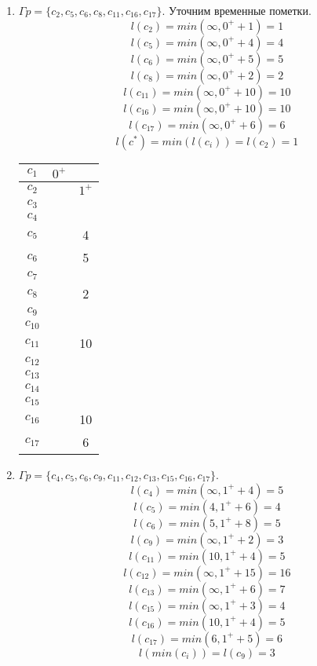 \documentclass[12pt, a4paper] {ncc}
\begin{document}
\begin{enumerate}
    \item $\Gamma p = \{ c_2, c_5, c_6, c_8, c_11, c_16, c_17\}$. Уточним временные пометки.  
        $$l(c_2)    = min(\infty, 0^+ + 1) = 1$$
        $$l(c_5)    = min(\infty, 0^+ + 4) = 4$$
        $$l(c_6)    = min(\infty, 0^+ + 5) = 5$$
        $$l(c_8)    = min(\infty, 0^+ + 2) = 2$$
        $$l(c_{11}) = min(\infty, 0^+ + 10) = 10$$
        $$l(c_{16}) = min(\infty, 0^+ + 10) = 10$$
        $$l(c_{17}) = min(\infty, 0^+ + 6) = 6$$
        $$l(c^*) = min(l(c_i)) = l(c_2) = 1$$
\begin{tabular} {|c|c|c|}
    \hline
    $c_{1}$  &$0^+$&      \\ \hline
    $c_{2}$  & \z  &$1^+$ \\ \hline
    $c_{3}$  & \z  & \z   \\ \hline
    $c_{4}$  & \z  & \z   \\ \hline
    $c_{5}$  & \z  & 4    \\ \hline
    $c_{6}$  & \z  & 5    \\ \hline
    $c_{7}$  & \z  & \z   \\ \hline
    $c_{8}$  & \z  & 2    \\ \hline
    $c_{9}$  & \z  & \z   \\ \hline
    $c_{10}$ & \z  & \z   \\ \hline
    $c_{11}$ & \z  & 10   \\ \hline
    $c_{12}$ & \z  & \z   \\ \hline
    $c_{13}$ & \z  & \z   \\ \hline
    $c_{14}$ & \z  & \z   \\ \hline
    $c_{15}$ & \z  & \z   \\ \hline
    $c_{16}$ & \z  & 10   \\ \hline
    $c_{17}$ & \z  & 6    \\ \hline 
\end{tabular}

    \item $\Gamma p = \{c_4, c_5, c_6, c_9, c_{11}, c_{12}, c_{13}, c_{15}, c_{16}, c_{17}\}$.
        $$l(c_4) = min(\infty, 1^+ + 4) = 5$$
        $$l(c_5) = min(4, 1^+ + 6) = 4$$
        $$l(c_6) = min(5, 1^+ + 8) = 5$$
        $$l(c_9) = min(\infty, 1^+ + 2) = 3$$
        $$l(c_{11}) = min(10, 1^+ + 4) = 5$$
        $$l(c_{12}) = min(\infty, 1^+ + 15) = 16$$
        $$l(c_{13}) = min(\infty, 1^+ + 6) = 7$$
        $$l(c_{15}) = min(\infty, 1^+ + 3) = 4$$
        $$l(c_{16}) = min(10, 1^+ + 4) = 5$$
        $$l(c_{17}) = min(6, 1^+ + 5) = 6$$
        $$l(min(c_i)) = l(c_9) = 3$$


\end{enumerate}
\end{document}
